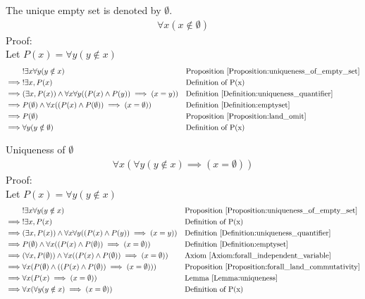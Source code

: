 \begin{defn}
\label{Definition:emptyset}
The unique empty set is denoted by $\emptyset$. \\
\begin{align*}
\forall x (x \notin \emptyset)
\end{align*}
Proof: \\
Let $P(x) = \forall y (y \notin x)$
\begin{align*}
& !\exists x \forall y (y \notin x) && \text{Proposition \ref{Proposition:uniqueness_of_empty_set}} \\
\implies & !\exists x, P(x)
&& \text{Definition of P(x)} \\
\implies & (\exists x, P(x)) \land \forall x \forall y ( (P(x) \land P(y)) \implies (x=y) )
&& \text{Definition \ref{Definition:uniqueness_quantifier}} \\
\implies & P(\emptyset) \land \forall x ( (P(x) \land P(\emptyset)) \implies (x=\emptyset) )
&& \text{Definition \ref{Definition:emptyset}} \\
\implies & P(\emptyset)
&& \text{Proposition \ref{Proposition:land_omit}} \\
\implies & \forall y (y \notin \emptyset)
&& \text{Definition of P(x)} \\
\end{align*}
\end{defn}

\begin{prop}
\label{Proposition:uniqueness_of_emptyset}
Uniqueness of $\emptyset$
\begin{align*}
\forall x (\forall y (y \notin x) \implies (x=\emptyset))
\end{align*}
Proof: \\
Let $P(x) = \forall y (y \notin x)$
\begin{align*}
& !\exists x \forall y (y \notin x) && \text{Proposition \ref{Proposition:uniqueness_of_empty_set}} \\
\implies & !\exists x, P(x)
&& \text{Definition of P(x)} \\
\implies & (\exists x, P(x)) \land \forall x \forall y ( (P(x) \land P(y)) \implies (x=y) )
&& \text{Definition \ref{Definition:uniqueness_quantifier}} \\
\implies & P(\emptyset) \land \forall x ( (P(x) \land P(\emptyset)) \implies (x=\emptyset) )
&& \text{Definition \ref{Definition:emptyset}} \\
\implies & (\forall x, P(\emptyset)) \land \forall x ( (P(x) \land P(\emptyset)) \implies (x=\emptyset) )
&& \text{Axiom \ref{Axiom:forall_independent_variable}} \\
\implies & \forall x ( P(\emptyset) \land ((P(x) \land P(\emptyset)) \implies (x=\emptyset)) )
&& \text{Proposition \ref{Proposition:forall_land_commutativity}} \\
\implies & \forall x (P(x) \implies (x=\emptyset))
&& \text{Lemma \ref{Lemma:uniqueness}} \\
\implies & \forall x (\forall y (y \notin x) \implies (x=\emptyset))
&& \text{Definition of P(x)} \\
\end{align*}
\end{prop}

